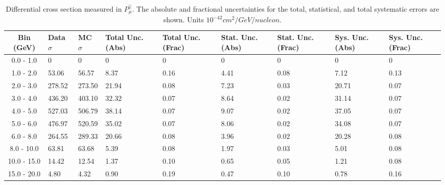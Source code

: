 \begin{table}[!htb]
    \centering
    \tiny
    \begin{tabular}{|c|p{0.5in}|p{0.5in}|p{0.5in}|p{0.5in}|p{0.5in}|p{0.5in}|p{0.5in}|p{0.5in}|}
        \hline
        Bin (GeV)& Data $\sigma$ & MC $\sigma$ & Total Unc. (Abs) & Total Unc. (Frac)  & Stat. Unc. (Abs) & Stat. Unc. (Frac) & Sys. Unc. (Abs) & Sys. Unc. (Frac)\\ \hline
0.0 - 1.0 & 0 & 0 & 0 & 0 & 0 & 0 & 0 & 0\\ \hline
1.0 - 2.0 & 53.06 & 56.57 & 8.37 & 0.16 & 4.41 & 0.08 & 7.12 & 0.13\\ \hline
2.0 - 3.0 & 278.52 & 273.50 & 21.94 & 0.08 & 7.23 & 0.03 & 20.71 & 0.07\\ \hline
3.0 - 4.0 & 436.20 & 403.10 & 32.32 & 0.07 & 8.64 & 0.02 & 31.14 & 0.07\\ \hline
4.0 - 5.0 & 527.03 & 506.79 & 38.14 & 0.07 & 9.07 & 0.02 & 37.05 & 0.07\\ \hline
5.0 - 6.0 & 476.97 & 520.59 & 35.02 & 0.07 & 8.06 & 0.02 & 34.08 & 0.07\\ \hline
6.0 - 8.0 & 264.55 & 289.33 & 20.66 & 0.08 & 3.96 & 0.02 & 20.28 & 0.08\\ \hline
8.0 - 10.0 & 63.81 & 63.68 & 5.39 & 0.08 & 1.97 & 0.03 & 5.01 & 0.08\\ \hline
10.0 - 15.0 & 14.42 & 12.54 & 1.37 & 0.10 & 0.65 & 0.05 & 1.21 & 0.08\\ \hline
15.0 - 20.0 & 4.80 & 4.32 & 0.90 & 0.19 & 0.47 & 0.10 & 0.78 & 0.16\\ \hline


    \end{tabular}
    \caption{Differential cross section measured in $P^{||}_\mu$. The absolute and fractional uncertainties for the total, statistical, and total systematic errors are shown. Units $10^{-42}cm^2/GeV/nucleon$.}
    \label{tab:ApdxA:XSecTable1Dpzmu}
\end{table}

